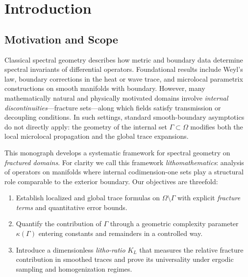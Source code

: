 

\chapter{Introduction}
\label{chap:introduction}

\section{Motivation and Scope}
\label{sec:intro-scope}

Classical spectral geometry describes how metric and boundary data determine
spectral invariants of differential operators. Foundational results include
Weyl’s law, boundary corrections in the heat or wave trace, and microlocal
parametrix constructions on smooth manifolds with boundary. However, many
mathematically natural and physically motivated domains involve \emph{internal
discontinuities}—fracture sets—along which fields satisfy transmission or
decoupling conditions. In such settings, standard smooth-boundary asymptotics
do not directly apply: the geometry of the internal set $\Gamma \subset \Omega$
modifies both the local microlocal propagation and the global trace expansions.

This monograph develops a systematic framework for spectral geometry on
\emph{fractured domains}. For clarity we call this framework
\emph{lithomathematics}: analysis of operators on manifolds where internal
codimension-one sets play a structural role comparable to the exterior boundary.
Our objectives are threefold:
\begin{enumerate}[label=(O\arabic*)]
  \item \label{obj:trace}
  Establish localized and global trace formulas on $\Omega\setminus\Gamma$
  with explicit \emph{fracture terms} and quantitative error bounds.
  \item \label{obj:geometry}
  Quantify the contribution of $\Gamma$ through a geometric complexity
  parameter $\kappa(\Gamma)$ entering constants and remainders in a controlled way.
  \item \label{obj:invariant}
  Introduce a dimensionless \emph{litho-ratio} $K_L$ that measures the relative
  fracture contribution in smoothed traces and prove its universality under
  ergodic sampling and homogenization regimes.
\end{enumerate}

